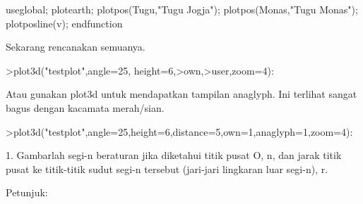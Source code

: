 \documentclass[a4paper,10pt]{article}
\begin{document}
\begin{eulernotebook}
\begin{eulercomment}
\begin{eulercomment}
\begin{eulerudf}
  useglobal;
  plotearth;
  plotpos(Tugu,"Tugu Jogja"); plotpos(Monas,"Tugu Monas");
  plotposline(v);
  endfunction
\end{eulerudf}
\begin{eulercomment}
Sekarang rencanakan semuanya.
\end{eulercomment}
\begin{eulerprompt}
>plot3d("testplot",angle=25, height=6,>own,>user,zoom=4):
\end{eulerprompt}
\begin{eulercomment}
Atau gunakan plot3d untuk mendapatkan tampilan anaglyph. Ini terlihat
sangat bagus dengan kacamata merah/sian.
\end{eulercomment}
\begin{eulerprompt}
>plot3d("testplot",angle=25,height=6,distance=5,own=1,anaglyph=1,zoom=4):
\end{eulerprompt}
\begin{eulercomment}
1. Gambarlah segi-n beraturan jika diketahui titik pusat O, n, dan
jarak titik pusat ke titik-titik sudut segi-n tersebut (jari-jari
lingkaran luar segi-n), r.

Petunjuk:


\end{eulercomment}
\end{eulercomment}
\end{eulercomment}
\end{eulernotebook}
\end{document}
